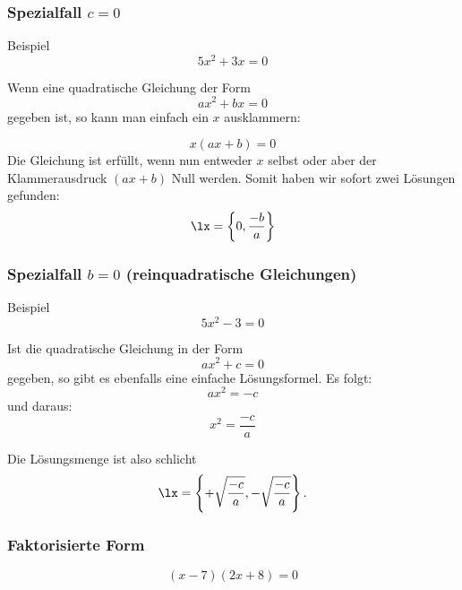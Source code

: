 
\subsubsection{Spezialfall $c=0$}

Beispiel
$$5x^2 + 3x = 0$$



Wenn eine quadratische Gleichung der Form
$$ax^2 +bx = 0$$
gegeben ist, so kann man einfach ein $x$ ausklammern:

$$x(ax+b)=0$$
 Die Gleichung ist erfüllt, wenn nun entweder $x$ selbst oder aber
 der Klammerausdruck $(ax+b)$ Null werden. Somit haben wir sofort zwei
 Lösungen gefunden:
 $$\lx=\left\{0, \frac{-b}{a}\right\}$$

 \newpage

 
 \subsubsection{Spezialfall $b=0$ (reinquadratische Gleichungen)}

Beispiel
$$5x^2 - 3 = 0$$





Ist die quadratische Gleichung in der Form
 $$ax^2 + c = 0$$
 gegeben, so gibt es ebenfalls eine einfache Lösungsformel. Es folgt:
 $$ax^2 = -c$$
 und daraus:
 $$x^2 = \frac{-c}{a}$$

 Die Lösungsmenge ist also schlicht
 $$\lx=\left\{ + \sqrt{\frac{-c}{a}}, -\sqrt{\frac{-c}{a}} \right\}.$$




\newpage

 \subsubsection{Faktorisierte Form}

$$(x-7)(2x+8) = 0$$


\newpage
